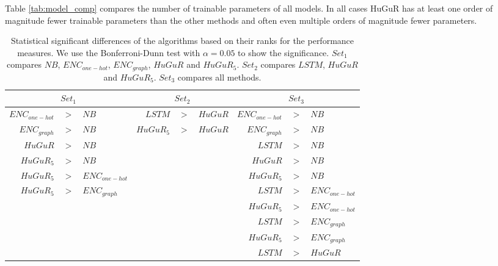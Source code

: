 Table \ref{tab:model_comp} compares the number of trainable parameters of all models. In all cases HuGuR has at least one order of magnitude fewer trainable parameters than the other methods and often even multiple orders of magnitude fewer parameters.


\begin{table}[t!]
    \centering
    \caption{Statistical significant differences of the algorithms based on their ranks for the performance measures. We use the Bonferroni-Dunn test with $\alpha = 0.05$ to show the significance. $Set_1$ compares $NB$, $ENC_{one-hot}$, $ENC_{graph}$, $HuGuR$ and $HuGuR_5$. $Set_2$ compares $LSTM$, $HuGuR$ and $HuGuR_5$. $Set_3$ compares all methods.
    }
    \label{tab:rank_difference}
    \begin{tabular}{rcl|rcl|rcl}
    \toprule
       \multicolumn{3}{c|}{$Set_1$}  & \multicolumn{3}{c|}{$Set_2$} & \multicolumn{3}{c}{$Set_3$} \\
       \midrule
         $ENC_{one-hot}$ &  $>$  & $NB$ & $LSTM$ &  $>$  & $HuGuR$  & \hspace{5pt} $ENC_{one-hot}$ &  $>$  & $NB$ \\
$ENC_{graph}$ & $>$ & $NB$ & \hspace{5pt} $HuGuR_5$ & $>$ & $HuGuR$ \hspace{5pt} & $ENC_{graph}$ &  $>$  & $NB$ \\
$HuGuR$ & $>$ & $NB$ & & &  & $LSTM$ &  $>$  & $NB$ \\
$HuGuR_5$ & $>$ & $NB$ & & & & $HuGuR$ &  $>$  & $NB$ \\
$HuGuR_5$ & $>$ & $ENC_{one-hot}$ \hspace{5pt} & & & & $HuGuR_5$ &  $>$  & $NB$ \\
$HuGuR_5$ & $>$ & $ENC_{graph}$ & & & & $LSTM$ &  $>$  & $ENC_{one-hot}$ \\
& & & & & & $HuGuR_5$ &  $>$  & $ENC_{one-hot}$ \\
& & & & & & $LSTM$ &  $>$  & $ENC_{graph}$ \\
& & & & & & $HuGuR_5$ &  $>$  & $ENC_{graph}$ \\
& & & & & & $LSTM$ &  $>$  & $HuGuR$\\
        \bottomrule
    \end{tabular}
    
    
\end{table}


